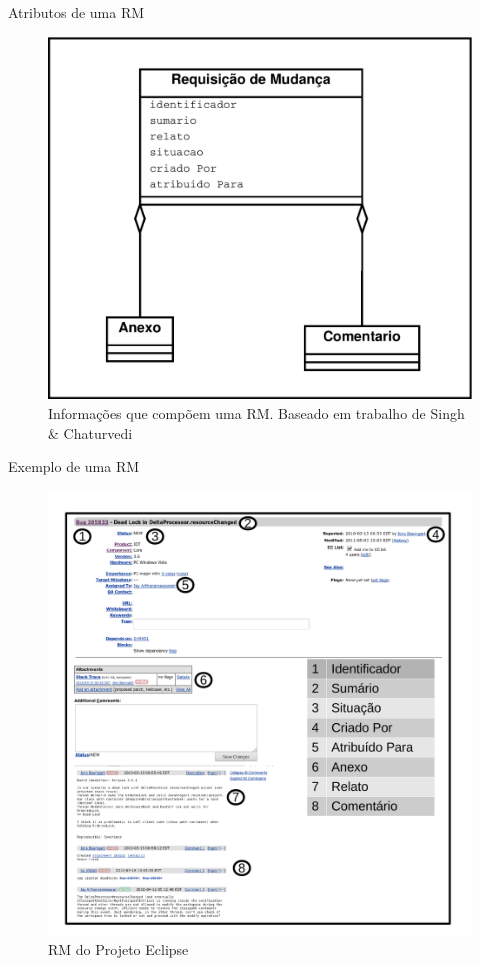 \documentclass[t,14pt,mathserif]{beamer}
\begin{document}
\begin{frame}{Atributos de uma RM}

    \begin{figure}[htpb]
        \centering
        \includegraphics[width=0.55\linewidth]{../img/diagrama-classe-atributos-requisicao-mudancas.pdf}
        \caption{Informações que compõem uma RM\@. Baseado em trabalho de Singh \&
            Chaturvedi~\cite{singh2011bug}}
\label{fig:diagrama-classe-atributos-requisicao-mudancas}
    \end{figure}

\end{frame}

\begin{frame}{Exemplo de uma RM}

    \begin{figure}[htpb]
        \centering
        \includegraphics[width=0.5\linewidth]{../img/rm-exemplo.pdf}
        \caption{RM do Projeto Eclipse}
\label{fig:rm-exemplo}
    \end{figure}

\end{frame}
\end{document}
